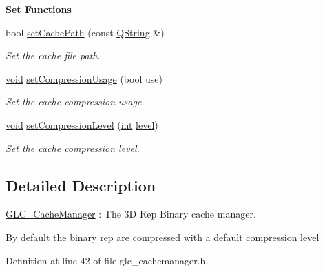 \begin{Indent}{\bf Set Functions}\par
\begin{DoxyCompactItemize}
\item 
bool \hyperlink{class_g_l_c___cache_manager_ab419a351dcdc0625f2ff9318caf82709}{set\-Cache\-Path} (const \hyperlink{group___u_a_v_objects_plugin_gab9d252f49c333c94a72f97ce3105a32d}{Q\-String} \&)
\begin{DoxyCompactList}\small\item\em Set the cache file path. \end{DoxyCompactList}\item 
\hyperlink{group___u_a_v_objects_plugin_ga444cf2ff3f0ecbe028adce838d373f5c}{void} \hyperlink{class_g_l_c___cache_manager_aca57d6bad063207ba95e6935084d3156}{set\-Compression\-Usage} (bool use)
\begin{DoxyCompactList}\small\item\em Set the cache compression usage. \end{DoxyCompactList}\item 
\hyperlink{group___u_a_v_objects_plugin_ga444cf2ff3f0ecbe028adce838d373f5c}{void} \hyperlink{class_g_l_c___cache_manager_a671a2f2c1a273c6a522db2b768e81c2d}{set\-Compression\-Level} (\hyperlink{ioapi_8h_a787fa3cf048117ba7123753c1e74fcd6}{int} \hyperlink{glext_8h_abc60a79088789bd61297bf5f9ff500d1}{level})
\begin{DoxyCompactList}\small\item\em Set the cache compression level. \end{DoxyCompactList}\end{DoxyCompactItemize}
\end{Indent}


\subsection{Detailed Description}
\hyperlink{class_g_l_c___cache_manager}{G\-L\-C\-\_\-\-Cache\-Manager} \-: The 3\-D Rep Binary cache manager. 

By default the binary rep are compressed with a default compression level 

Definition at line 42 of file glc\-\_\-cachemanager.\-h.



